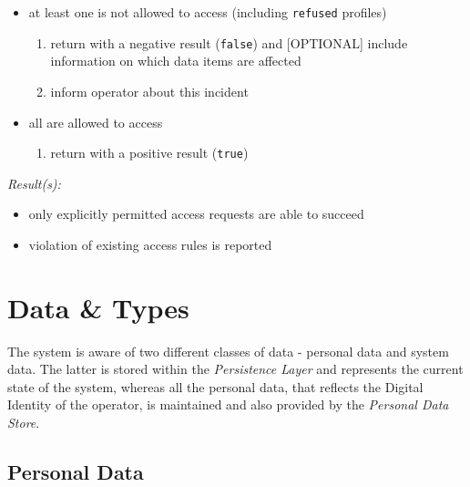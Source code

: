 \documentclass[12pt,english,a4paper,titlepage,cleardoublepage=empty,dottedtoc]{report}
\providecommand{\tightlist}{%
  \setlength{\itemsep}{0pt}\setlength{\parskip}{0pt}}
\begin{document}
\begin{enumerate}
\begin{itemize}
    \begin{itemize}
    \tightlist
    \item
      at least one is not allowed to access (including \texttt{refused}
      profiles)

      \begin{enumerate}
      \def\labelenumii{\arabic{enumii})}
      \tightlist
      \item
        return with a negative result (\texttt{false}) and
        {[}OPTIONAL{]} include information on which data items are
        affected
      \item
        inform operator about this incident
      \end{enumerate}
    \item
      all are allowed to access

      \begin{enumerate}
      \def\labelenumii{\arabic{enumii})}
      \tightlist
      \item
        return with a positive result (\texttt{true})
      \end{enumerate}
    \end{itemize}
  \end{itemize}
\end{enumerate}

\emph{Result(s):}

\begin{itemize}
\tightlist
\item
  only explicitly permitted access requests are able to succeed
\item
  violation of existing access rules is reported
\end{itemize}

\section{Data \& Types}\label{data-types}

The system is aware of two different classes of data - personal data and
system data. The latter is stored within the \emph{Persistence Layer}
and represents the current state of the system, whereas all the personal
data, that reflects the Digital Identity of the operator, is maintained
and also provided by the \emph{Personal Data Store}.

\subsection{Personal Data}\label{personal-data}
\end{document}
